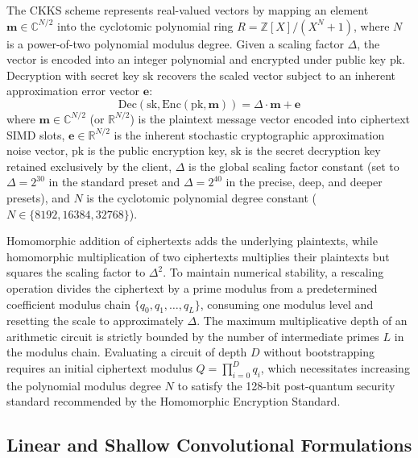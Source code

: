 \documentclass[conference]{IEEEtran}
\begin{document}
The CKKS scheme represents real-valued vectors by mapping an element $\mathbf{m} \in \mathbb{C}^{N/2}$ into the cyclotomic polynomial ring $R = \mathbb{Z}[X]/(X^N + 1)$, where $N$ is a power-of-two polynomial modulus degree. Given a scaling factor $\Delta$, the vector is encoded into an integer polynomial and encrypted under public key $\mathrm{pk}$. Decryption with secret key $\mathrm{sk}$ recovers the scaled vector subject to an inherent approximation error vector $\mathbf{e}$:
\begin{equation}
\mathrm{Dec}(\mathrm{sk}, \mathrm{Enc}(\mathrm{pk}, \mathbf{m})) = \Delta \cdot \mathbf{m} + \mathbf{e}
\label{eq:ckks}
\end{equation}
where $\mathbf{m} \in \mathbb{C}^{N/2}$ (or $\mathbb{R}^{N/2}$) is the plaintext message vector encoded into ciphertext SIMD slots, $\mathbf{e} \in \mathbb{R}^{N/2}$ is the inherent stochastic cryptographic approximation noise vector, $\mathrm{pk}$ is the public encryption key, $\mathrm{sk}$ is the secret decryption key retained exclusively by the client, $\Delta$ is the global scaling factor constant (set to $\Delta = 2^{30}$ in the standard preset and $\Delta = 2^{40}$ in the precise, deep, and deeper presets), and $N$ is the cyclotomic polynomial degree constant ($N \in \{8192, 16384, 32768\}$).

Homomorphic addition of ciphertexts adds the underlying plaintexts, while homomorphic multiplication of two ciphertexts multiplies their plaintexts but squares the scaling factor to $\Delta^2$. To maintain numerical stability, a rescaling operation divides the ciphertext by a prime modulus from a predetermined coefficient modulus chain $\{q_0, q_1, \ldots, q_L\}$, consuming one modulus level and resetting the scale to approximately $\Delta$. The maximum multiplicative depth of an arithmetic circuit is strictly bounded by the number of intermediate primes $L$ in the modulus chain. Evaluating a circuit of depth $D$ without bootstrapping requires an initial ciphertext modulus $Q = \prod_{i=0}^{D} q_i$, which necessitates increasing the polynomial modulus degree $N$ to satisfy the 128-bit post-quantum security standard recommended by the Homomorphic Encryption Standard.

\subsection{Linear and Shallow Convolutional Formulations}
\end{document}
